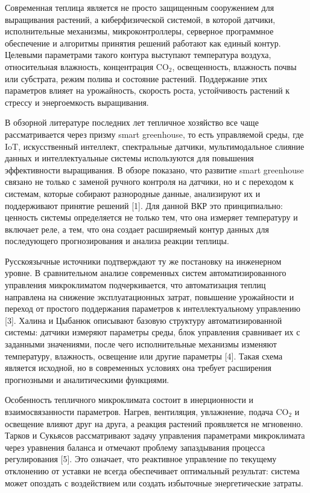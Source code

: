 \documentclass[a4paper,14pt]{extarticle}
\begin{document}
Современная теплица является не просто защищенным сооружением для
выращивания растений, а киберфизической системой, в которой датчики,
исполнительные механизмы, микроконтроллеры, серверное программное
обеспечение и алгоритмы принятия решений работают как единый контур.
Целевыми параметрами такого контура выступают температура воздуха,
относительная влажность, концентрация CO\(_2\), освещенность, влажность
почвы или субстрата, режим полива и состояние растений. Поддержание этих
параметров влияет на урожайность, скорость роста, устойчивость растений
к стрессу и энергоемкость выращивания.

В обзорной литературе последних лет тепличное хозяйство все чаще
рассматривается через призму smart greenhouse, то есть управляемой
среды, где IoT, искусственный интеллект, спектральные датчики,
мультимодальное слияние данных и интеллектуальные системы используются
для повышения эффективности выращивания. В обзоре показано, что развитие
smart greenhouse связано не только с заменой ручного контроля на
датчики, но и с переходом к системам, которые собирают разнородные
данные, анализируют их и поддерживают принятие решений {[}1{]}. Для
данной ВКР это принципиально: ценность системы определяется не только
тем, что она измеряет температуру и включает реле, а тем, что она
создает расширяемый контур данных для последующего прогнозирования и
анализа реакции теплицы.

Русскоязычные источники подтверждают ту же постановку на инженерном
уровне. В сравнительном анализе современных систем автоматизированного
управления микроклиматом подчеркивается, что автоматизация теплиц
направлена на снижение эксплуатационных затрат, повышение урожайности и
переход от простого поддержания параметров к интеллектуальному
управлению {[}3{]}. Халина и Цыбанюк описывают базовую структуру
автоматизированной системы: датчики измеряют параметры среды, блок
управления сравнивает их с заданными значениями, после чего
исполнительные механизмы изменяют температуру, влажность, освещение или
другие параметры {[}4{]}. Такая схема является исходной, но в
современных условиях она требует расширения прогнозными и аналитическими
функциями.

Особенность тепличного микроклимата состоит в инерционности и
взаимосвязанности параметров. Нагрев, вентиляция, увлажнение, подача
CO\(_2\) и освещение влияют друг на друга, а реакция растений
проявляется не мгновенно. Тарков и Сукьясов рассматривают задачу
управления параметрами микроклимата через уравнения баланса и отмечают
проблему запаздывания процесса регулирования {[}5{]}. Это означает, что
реактивное управление по текущему отклонению от уставки не всегда
обеспечивает оптимальный результат: система может опоздать с
воздействием или создать избыточные энергетические затраты.
\end{document}
